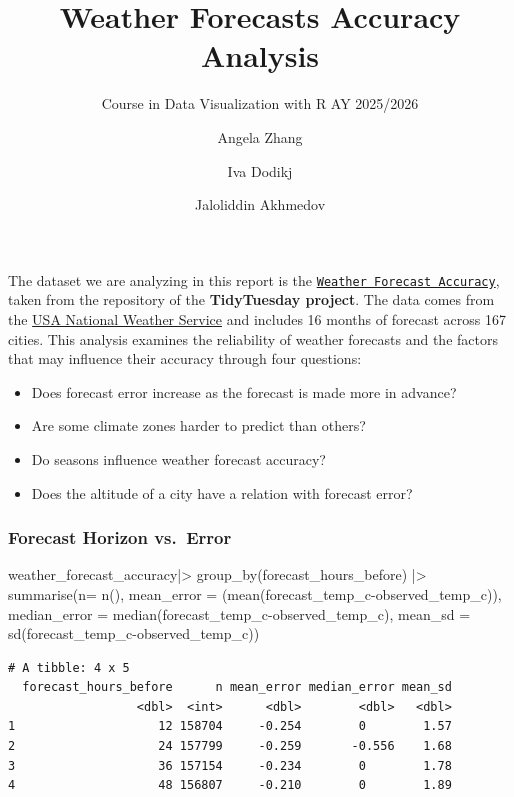 \documentclass[
  letterpaper,
  DIV=11,
  numbers=noendperiod]{scrartcl}
\title{Weather Forecasts Accuracy Analysis}
\subtitle{Course in Data Visualization with R AY 2025/2026}
\author{Angela Zhang \and Iva Dodikj \and Jaloliddin Akhmedov}
\date{}
\newenvironment{Shaded}{\begin{snugshade}}{\end{snugshade}}
\newcommand{\AttributeTok}[1]{\textcolor[rgb]{0.40,0.45,0.13}{#1}}
\newcommand{\FunctionTok}[1]{\textcolor[rgb]{0.28,0.35,0.67}{#1}}
\newcommand{\NormalTok}[1]{\textcolor[rgb]{0.00,0.23,0.31}{#1}}
\newcommand{\SpecialCharTok}[1]{\textcolor[rgb]{0.37,0.37,0.37}{#1}}
\providecommand{\tightlist}{%
  \setlength{\itemsep}{0pt}\setlength{\parskip}{0pt}}
\begin{document}
\maketitle


The dataset we are analyzing in this report is the
\href{https://github.com/rfordatascience/tidytuesday/tree/main/data/2022/2022-12-20}{\texttt{Weather\ Forecast\ Accuracy}},
taken from the repository of the \textbf{TidyTuesday project}. The data
comes from the \href{https://www.weather.gov/}{USA National Weather
Service} and includes 16 months of forecast across 167 cities. This
analysis examines the reliability of weather forecasts and the factors
that may influence their accuracy through four questions:

\begin{itemize}
\tightlist
\item
  Does forecast error increase as the forecast is made more in advance?
\item
  Are some climate zones harder to predict than others?
\item
  Do seasons influence weather forecast accuracy?
\item
  Does the altitude of a city have a relation with forecast error?
\end{itemize}

\subsubsection{Forecast Horizon
vs.~Error}\label{forecast-horizon-vs.-error}

\begin{Shaded}
\begin{Highlighting}[]
\NormalTok{weather\_forecast\_accuracy}\SpecialCharTok{|\textgreater{}}
  \FunctionTok{group\_by}\NormalTok{(forecast\_hours\_before) }\SpecialCharTok{|\textgreater{}}
  \FunctionTok{summarise}\NormalTok{(}\AttributeTok{n=} \FunctionTok{n}\NormalTok{(),}
    \AttributeTok{mean\_error =}\NormalTok{ (}\FunctionTok{mean}\NormalTok{(forecast\_temp\_c}\SpecialCharTok{{-}}\NormalTok{observed\_temp\_c)),}
    \AttributeTok{median\_error =} \FunctionTok{median}\NormalTok{(forecast\_temp\_c}\SpecialCharTok{{-}}\NormalTok{observed\_temp\_c),}
    \AttributeTok{mean\_sd =} \FunctionTok{sd}\NormalTok{(forecast\_temp\_c}\SpecialCharTok{{-}}\NormalTok{observed\_temp\_c))}
\end{Highlighting}
\end{Shaded}

\begin{verbatim}
# A tibble: 4 x 5
  forecast_hours_before      n mean_error median_error mean_sd
                  <dbl>  <int>      <dbl>        <dbl>   <dbl>
1                    12 158704     -0.254        0        1.57
2                    24 157799     -0.259       -0.556    1.68
3                    36 157154     -0.234        0        1.78
4                    48 156807     -0.210        0        1.89
\end{verbatim}
\end{document}
